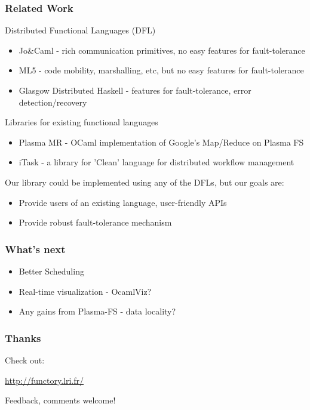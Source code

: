 \documentclass[xcolor=dvipsnames,8pt]{beamer}
\begin{document}
\begin{frame}\frametitle {Related Work}
  Distributed Functional Languages (DFL)
  \begin{itemize}
  \item Jo\&Caml - rich communication primitives, no easy features
    for fault-tolerance
  \item ML5 - code mobility, marshalling, etc, but no
    easy features for fault-tolerance
  \item Glasgow Distributed Haskell - features for fault-tolerance,
    error detection/recovery
  \end{itemize}
  Libraries for existing functional languages
  \begin{itemize}
  \item Plasma MR - OCaml implementation of Google's Map/Reduce on
    Plasma FS
  \item iTask - a library for 'Clean' language for distributed workflow management
  \end{itemize}

Our library could be implemented using any of the DFLs, but our goals
are:
\begin{itemize}
\item Provide users of an existing language, user-friendly APIs
\item Provide robust fault-tolerance mechanism 
\end{itemize}
  
\end{frame}


\begin{frame}\frametitle {What's next}
  \begin{itemize}
  \item Better Scheduling
  \item Real-time visualization - OcamlViz?
  \item Any gains from Plasma-FS - data locality?
  \end{itemize}
\end{frame}


\begin{frame}\frametitle {Thanks}


\bigskip
Check out:
\begin{center}
 \textcolor{blue}{\url{http://functory.lri.fr/}}  
\end{center}

Feedback, comments welcome!

\end{frame}

\end{document}
